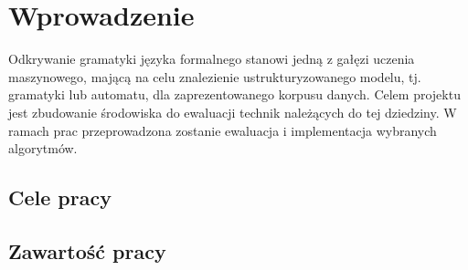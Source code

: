 \chapter{Wprowadzenie}
\label{cha:wprowadzenie}

Odkrywanie gramatyki języka formalnego stanowi jedną z gałęzi uczenia maszynowego, mającą na celu znalezienie ustrukturyzowanego modelu, tj. gramatyki lub automatu, dla zaprezentowanego korpusu danych. Celem projektu jest zbudowanie środowiska do ewaluacji technik należących do tej dziedziny. W ramach prac przeprowadzona zostanie ewaluacja i implementacja wybranych algorytmów.


\section{Cele pracy}
\label{sec:celePracy}



\section{Zawartość pracy}
\label{sec:zawartoscPracy}


